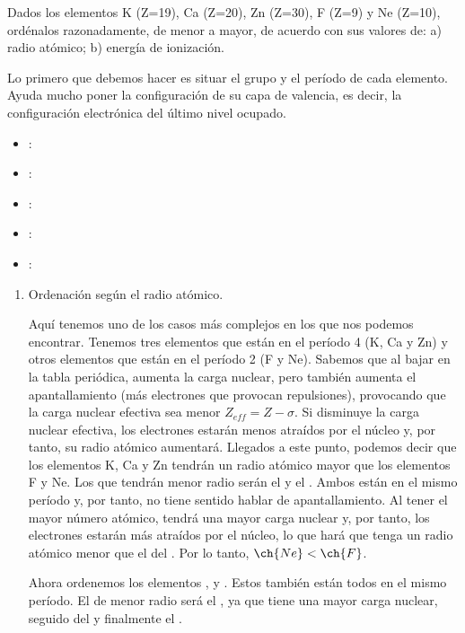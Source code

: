 \begin{example}
    Dados los elementos K (Z=19), Ca (Z=20), Zn (Z=30), F (Z=9) y Ne (Z=10), ordénalos razonadamente, de menor a mayor, de acuerdo con sus valores de: a) radio atómico; b) energía de ionización.

        {}

    Lo primero que debemos hacer es situar el grupo y el período de cada elemento. Ayuda mucho poner la configuración de su capa de valencia, es decir, la configuración electrónica del último nivel ocupado.
    \begin{itemize}
        \item {}: 
        \item {}: 
        \item {}: 
        \item {}: 
        \item {}: 
    \end{itemize}

    \begin{enumerate}[label=\letraminuscula]
            \item Ordenación según el radio atómico.

            Aquí tenemos uno de los casos más complejos en los que nos podemos encontrar. Tenemos tres elementos que están en el período 4 (K, Ca y Zn) y otros elementos que están en el período 2 (F y Ne).
            Sabemos que al bajar en la tabla periódica, aumenta la carga nuclear, pero también aumenta el apantallamiento (más electrones que provocan repulsiones), provocando que la carga nuclear efectiva sea menor \( Z_{eff} = Z - \sigma \).
            Si disminuye la carga nuclear efectiva, los electrones estarán menos atraídos por el núcleo y, por tanto, su radio atómico aumentará.
            Llegados a este punto, podemos decir que los elementos K, Ca y Zn tendrán un radio atómico mayor que los elementos F y Ne.
            Los que tendrán menor radio serán el  y el .
            Ambos están en el mismo período y, por tanto, no tiene sentido hablar de apantallamiento.
            Al tener el  mayor número atómico, tendrá una mayor carga nuclear y, por tanto, los electrones estarán más atraídos por el núcleo, lo que hará que tenga un radio atómico menor que el del .
            Por lo tanto, \( \ch{Ne} < \ch{F} \).

            Ahora ordenemos los elementos ,  y .
            Estos también están todos en el mismo período. El de menor radio será el , ya que tiene una mayor carga nuclear, seguido del  y finalmente el .


\end{enumerate}
\end{example}

